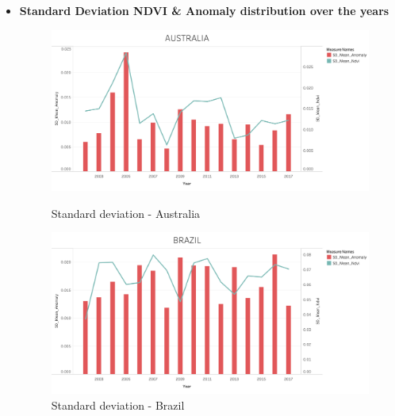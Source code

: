 \begin{itemize}
    \clearpage
    \newpage

    \item \textbf{Standard Deviation NDVI \& Anomaly distribution over the years}

    \begin{figure}[!htb]
        \begin{minipage}{0.5\textwidth}
            \centering
            \includegraphics[width=1.0\linewidth]{figures/ch5/StandardDeviation/AUSTRALIA_SD.png}
            \caption{Standard deviation - Australia}\label{Fig:AUSTRALIA_SD}
        \end{minipage}\hfill
        \begin{minipage}{0.5\textwidth}
            \centering
            \includegraphics[width=1.0\linewidth]{figures/ch5/StandardDeviation/BRAZIL_SD.png}
            \caption{Standard deviation - Brazil}\label{Fig:BRAZIL_SD}
        \end{minipage}
    \end{figure}
    

\end{itemize}
